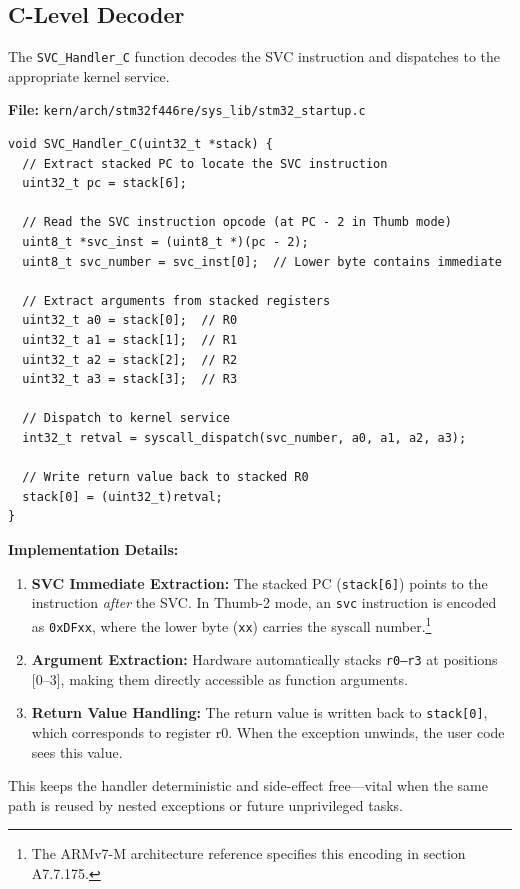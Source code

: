 \documentclass[11pt,a4paper]{article}
\newcommand{\file}[1]{\texttt{#1}}
\begin{document}
\subsection{C-Level Decoder}
The \texttt{SVC\_Handler\_C} function decodes the SVC instruction and dispatches to the appropriate kernel service.

\vspace{0.3cm}
\noindent\textbf{File:} \file{kern/arch/stm32f446re/sys\_lib/stm32\_startup.c}
\begin{verbatim}
void SVC_Handler_C(uint32_t *stack) {
  // Extract stacked PC to locate the SVC instruction
  uint32_t pc = stack[6];
  
  // Read the SVC instruction opcode (at PC - 2 in Thumb mode)
  uint8_t *svc_inst = (uint8_t *)(pc - 2);
  uint8_t svc_number = svc_inst[0];  // Lower byte contains immediate
  
  // Extract arguments from stacked registers
  uint32_t a0 = stack[0];  // R0
  uint32_t a1 = stack[1];  // R1
  uint32_t a2 = stack[2];  // R2
  uint32_t a3 = stack[3];  // R3
  
  // Dispatch to kernel service
  int32_t retval = syscall_dispatch(svc_number, a0, a1, a2, a3);
  
  // Write return value back to stacked R0
  stack[0] = (uint32_t)retval;
}
\end{verbatim}

\textbf{Implementation Details:}
\begin{enumerate}[leftmargin=2em,label=\alph*)]
  \item \textbf{SVC Immediate Extraction:} The stacked PC (\texttt{stack[6]}) points to the instruction \emph{after} the SVC. In Thumb-2 mode, an \texttt{svc} instruction is encoded as \texttt{0xDFxx}, where the lower byte (\texttt{xx}) carries the syscall number.\footnote{The ARMv7-M architecture reference specifies this encoding in section A7.7.175.}
  \item \textbf{Argument Extraction:} Hardware automatically stacks \texttt{r0--r3} at positions [0--3], making them directly accessible as function arguments.
  \item \textbf{Return Value Handling:} The return value is written back to \texttt{stack[0]}, which corresponds to register r0. When the exception unwinds, the user code sees this value.
\end{enumerate}

This keeps the handler deterministic and side-effect free---vital when the same path is reused by nested exceptions or future unprivileged tasks.
\end{document}

